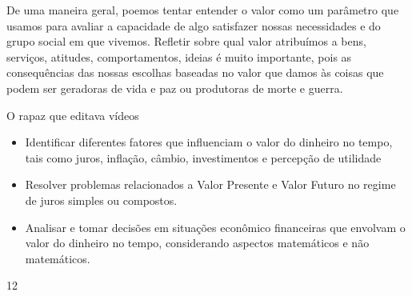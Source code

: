 \begin{reflection}
De uma maneira geral, poemos tentar entender o valor como um parâmetro que usamos para avaliar a capacidade de algo satisfazer nossas necessidades e do grupo social em que vivemos. Refletir sobre qual valor atribuímos a bens, serviços, atitudes, comportamentos, ideias é muito importante, pois as consequências das nossas escolhas baseadas no valor que damos às coisas que podem ser geradoras de vida e paz ou produtoras de morte e guerra.
\end{reflection}

\clearpage

\def\currentcolor{session2}

\begin{objectives}{O rapaz que editava vídeos}
{
\begin{itemize}
\item Identificar diferentes fatores que influenciam o valor do dinheiro no tempo, tais como juros, inflação, câmbio, investimentos e percepção de utilidade
\item Resolver problemas relacionados a Valor Presente e Valor Futuro no regime de juros simples ou compostos.
\item Analisar e tomar decisões em situações econômico financeiras que envolvam o valor do dinheiro no tempo, considerando aspectos matemáticos e não matemáticos.
\end{itemize}
}{1}{2}
\end{objectives}

